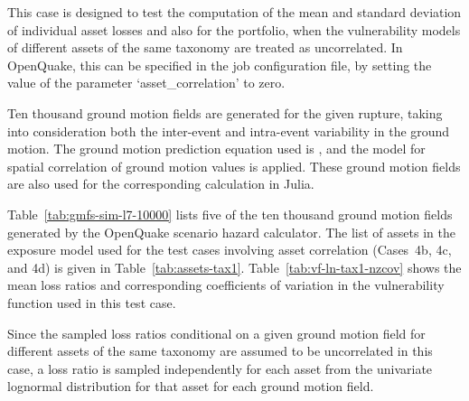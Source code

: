 This case is designed to test the computation of the mean and standard deviation of individual asset losses and also for the portfolio, when the vulnerability models of different assets of the same taxonomy are treated as uncorrelated. In OpenQuake, this can be specified in the job configuration file, by setting the value of the parameter `asset\_correlation' to zero.

Ten thousand ground motion fields are generated for the given rupture, taking into consideration both the inter-event and intra-event variability in the ground motion. The ground motion prediction equation used is \citet{boore2008}, and the \citet{jayaram2009} model for spatial correlation of ground motion values is applied. These ground motion fields are also used for the corresponding calculation in Julia.




Table~\ref{tab:gmfs-sim-l7-10000} lists five of the ten thousand ground motion fields generated by the OpenQuake scenario hazard calculator. The list of assets in the exposure model used for the test cases involving asset correlation (Cases~4b, 4c, and 4d) is given in Table~\ref{tab:assets-tax1}. Table~\ref{tab:vf-ln-tax1-nzcov} shows the mean loss ratios and corresponding coefficients of variation in the vulnerability function used in this test case.

Since the sampled loss ratios conditional on a given ground motion field for different assets of the same taxonomy are assumed to be uncorrelated in this case, a loss ratio is sampled independently for each asset from the univariate lognormal distribution for that asset for each ground motion field.